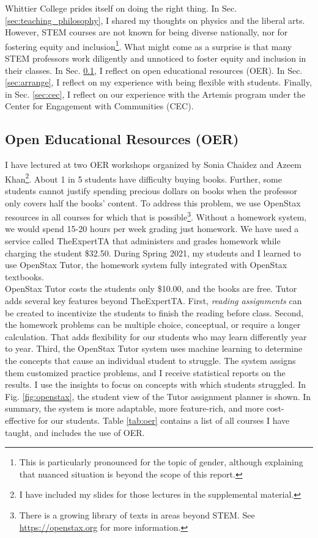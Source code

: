 \documentclass[../../../main.tex]{subfiles}
\begin{document}
Whittier College prides itself on doing the right thing.  In Sec. \ref{sec:teaching_philosophy}, I shared my thoughts on physics and the liberal arts.  However, STEM courses are not known for being diverse nationally, nor for fostering equity and inclusion\footnote{This is particularly pronounced for the topic of gender, although explaining that nuanced situation is beyond the scope of this report.}.  What might come as a surprise is that many STEM professors work diligently and unnoticed to foster equity and inclusion in their classes.  In Sec. \ref{sec:oer}, I reflect on open educational resources (OER).  In Sec. \ref{sec:arrange}, I reflect on my experience with being flexible with students.  Finally, in Sec. \ref{sec:cec}, I reflect on our experience with the Artemis program under the Center for Engagement with Communities (CEC).

\subsection{Open Educational Resources (OER)}
\label{sec:oer}

I have lectured at two OER workshops organized by Sonia Chaidez and Azeem Khan\footnote{I have included my slides for those lectures in the supplemental material.}.  About 1 in 5 students have difficulty buying books.  Further, some students cannot justify spending precious dollars on books when the professor only covers half the books' content.  To address this problem, we use OpenStax resources in all courses for which that is possible\footnote{There is a growing library of texts in areas beyond STEM.  See \url{https://openstax.org} for more information.}.  Without a homework system, we would spend 15-20 hours per week grading just homework.  We have used a service called TheExpertTA that administers and grades homework while charging the student \$32.50.  During Spring 2021, my students and I learned to use OpenStax Tutor, the homework system fully integrated with OpenStax textbooks.
\\
\vspace{0.15cm}
OpenStax Tutor costs the students only \$10.00, and the books are free.  Tutor adds several key features beyond TheExpertTA.  First, \textit{reading assignments} can be created to incentivize the students to finish the reading before class.  Second, the homework problems can be multiple choice, conceptual, or require a longer calculation.  That adds flexibility for our students who may learn differently year to year.  Third, the OpenStax Tutor system uses machine learning to determine the concepts that cause an individual student to struggle.  The system assigns them customized practice problems, and I receive statistical reports on the results.  I use the insights to focus on concepts with which students struggled.  In Fig. \ref{fig:openstax}, the student view of the Tutor assignment planner is shown.  In summary, the system is more adaptable, more feature-rich, and more cost-effective for our students.  Table \ref{tab:oer} contains a list of all courses I have taught, and includes the use of OER.
\\
\vspace{0.15cm}
\end{document}
